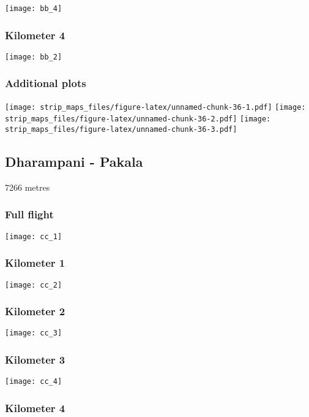 \documentclass[]{article}
\begin{document}
\texttt{[image: bb\_4]}

\subsubsection{Kilometer 4}\label{kilometer-4-26}

\texttt{[image: bb\_2]}

\subsubsection{Additional plots}\label{additional-plots-27}

\texttt{[image: strip\_maps\_files/figure-latex/unnamed-chunk-36-1.pdf]}
\texttt{[image: strip\_maps\_files/figure-latex/unnamed-chunk-36-2.pdf]}
\texttt{[image: strip\_maps\_files/figure-latex/unnamed-chunk-36-3.pdf]}

\newpage

\subsection{Dharampani - Pakala}\label{dharampani---pakala}

7266 metres

\subsubsection{Full flight}\label{full-flight-28}

\texttt{[image: cc\_1]}

\subsubsection{Kilometer 1}\label{kilometer-1-28}

\texttt{[image: cc\_2]}

\subsubsection{Kilometer 2}\label{kilometer-2-28}

\texttt{[image: cc\_3]}

\subsubsection{Kilometer 3}\label{kilometer-3-28}

\texttt{[image: cc\_4]}

\subsubsection{Kilometer 4}\label{kilometer-4-27}
\end{document}
